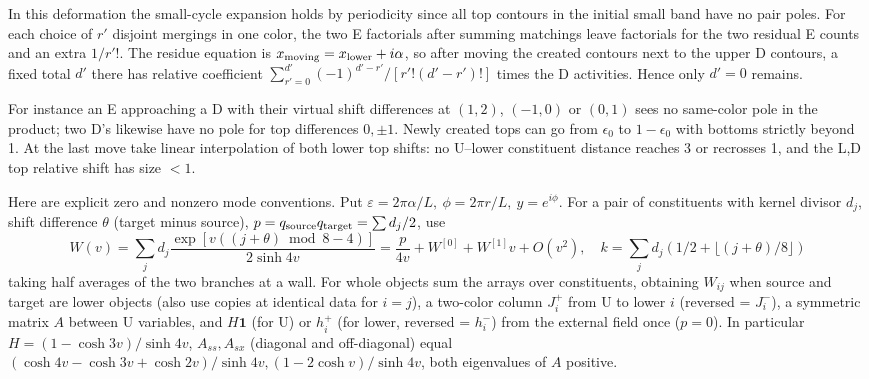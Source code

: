 In this deformation the small-cycle expansion holds by periodicity since all top contours in the initial small band have no pair poles. For each choice of \(r'\) disjoint mergings in one color, the two E factorials after summing matchings leave factorials for the two residual E counts and an extra \(1/r'!\). The residue equation is \(x_{\rm moving}=x_{\rm lower}+i\alpha\), so after moving the created contours next to the upper D contours, a fixed total \(d'\) there has relative coefficient \(\sum_{r'=0}^{d'}(-1)^{d'-r'}/[r'!(d'-r')!]\) times the D activities. Hence only \(d'=0\) remains.

For instance an E approaching a D with their virtual shift differences at \((1,2)\), \((-1,0)\) or \((0,1)\) sees no same-color pole in the product; two D's likewise have no pole for top differences \(0,\pm1\). Newly created tops can go from \(\epsilon_0\) to \(1-\epsilon_0\) with bottoms strictly beyond 1. At the last move take linear interpolation of both lower top shifts: no U--lower constituent distance reaches 3 or recrosses 1, and the L,D top relative shift has size \(<1\).

Here are explicit zero and nonzero mode conventions. Put \(\varepsilon=2\pi\alpha/L,\ \phi=2\pi r/L,\ y=e^{i\phi}\). For a pair of constituents with kernel divisor \(d_j\), shift difference \(\theta\) (target minus source), \(p=q_{\rm source}q_{\rm target}=\sum d_j/2\), use
\[
 W(v)=\sum_j d_j\frac{\exp[v((j+\theta)\bmod8-4)]}{2\sinh4v}
 =\frac{p}{4v}+W^{[0]}+W^{[1]}v+O(v^2),\quad
 k=\sum_j d_j(1/2+\lfloor(j+\theta)/8\rfloor)
\]
taking half averages of the two branches at a wall. For whole objects sum the arrays over constituents, obtaining \(W_{ij}\) when source and target are lower objects (also use copies at identical data for \(i=j\)), a two-color column \(J_i^+\) from \(\mathrm U\) to lower \(i\) (reversed = \(J_i^-\)), a symmetric matrix \(A\) between U variables, and \(H\mathbf1\) (for U) or \(h_i^+\) (for lower, reversed = \(h_i^-\)) from the external field once (\(p=0\)). In particular \(H=(1-\cosh3v)/\sinh4v\), \(A_{ss},A_{sx}\) (diagonal and off-diagonal) equal \((\cosh4v-\cosh3v+\cosh2v)/\sinh4v,(1-2\cosh v)/\sinh4v\), both eigenvalues of \(A\) positive.

